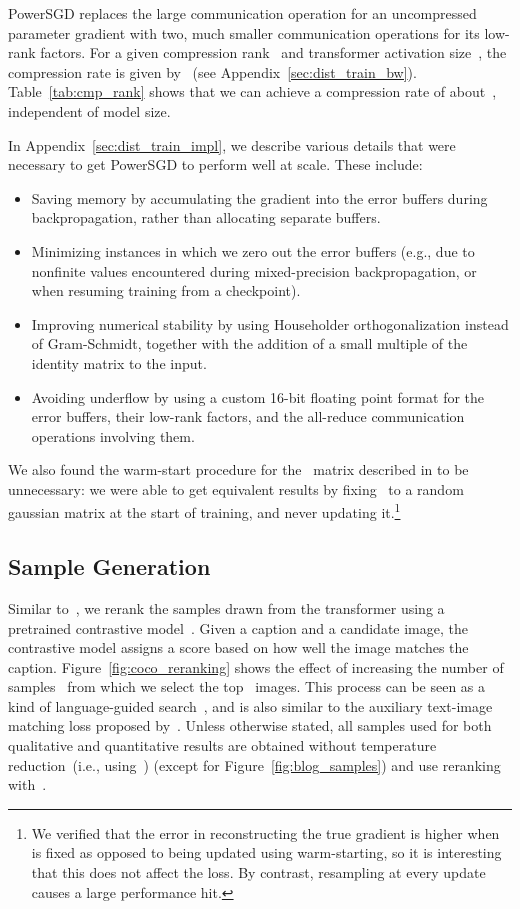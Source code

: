 \documentclass{article}
\begin{document}
PowerSGD replaces the large communication operation for an uncompressed parameter gradient with two, much smaller communication operations for its low-rank factors. For a given compression rank~ and transformer activation size~, the compression rate is given by~ (see Appendix~\ref{sec:dist_train_bw}). Table~\ref{tab:cmp_rank} shows that we can achieve a compression rate of about~, independent of model size.

In Appendix~\ref{sec:dist_train_impl}, we describe various details that were necessary to get PowerSGD to perform well at scale. These include:
\begin{itemize}
    \item Saving memory by accumulating the gradient into the error buffers during backpropagation, rather than allocating separate buffers.
    \item Minimizing instances in which we zero out the error buffers (e.g., due to nonfinite values encountered during mixed-precision backpropagation, or when resuming training from a checkpoint).
    \item Improving numerical stability by using Householder orthogonalization instead of Gram-Schmidt, together with the addition of a small multiple of the identity matrix to the input.
    \item Avoiding underflow by using a custom 16-bit floating point format for the error buffers, their low-rank factors, and the all-reduce communication operations involving them.
\end{itemize}
We also found the warm-start procedure for the~ matrix described in \citet{vogels2019powersgd} to be unnecessary: we were able to get equivalent results by fixing~ to a random gaussian matrix at the start of training, and never updating it.\footnote{We verified that the error in reconstructing the true gradient is higher when~ is fixed as opposed to being updated using warm-starting, so it is interesting that this does not affect the loss. By contrast, resampling  at every update causes a large performance hit.}
\subsection{Sample Generation}
Similar to~\citet{razavi2019generating}, we rerank the samples drawn from the transformer using a pretrained contrastive model~\cite{radford2021learning}. Given a caption and a candidate image, the contrastive model assigns a score  based on how well the image matches the caption. Figure~\ref{fig:coco_reranking} shows the effect of increasing the number of samples~ from which we select the top~ images. This process can be seen as a kind of language-guided search~\cite{andreas2017learning}, and is also similar to the auxiliary text-image matching loss proposed by~\citet{xu2018attngan}. Unless otherwise stated, all samples used for both qualitative and quantitative results are obtained without temperature reduction~(i.e., using~) (except for Figure~\ref{fig:blog_samples}) and use reranking with~.
\end{document}
